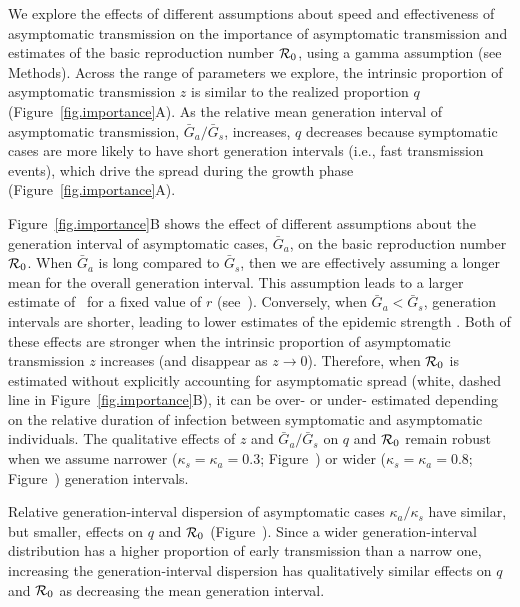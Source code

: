 We explore the effects of different assumptions about speed and effectiveness of asymptomatic transmission on the importance of asymptomatic transmission and estimates of the basic reproduction number ${\cal{R}}_0$, using a gamma assumption (see Methods).
Across the range of parameters we explore, the intrinsic proportion of asymptomatic transmission $z$ is similar to the realized proportion $q$ (Figure~\ref{fig.importance}A).
As the relative mean generation interval of asymptomatic transmission, $\bar G_a/\bar G_s$, increases, $q$ decreases because symptomatic cases are more likely to have short generation intervals (i.e., fast transmission events), which drive the spread during the growth phase (Figure~\ref{fig.importance}A).
\DIFaddbegin {}\DIFaddend 

Figure~\ref{fig.importance}B shows the effect of different assumptions about the generation interval of asymptomatic cases, $\bar G_a$, on the basic reproduction number ${\cal{R}}_0$.
When $\bar G_a$ is long compared to $\bar G_s$, then we are effectively assuming a longer mean for the overall generation interval. 
This assumption leads to a larger estimate of \Ro\ for a fixed value of $r$ (see~\citep{park_2019practical}).
Conversely, when $\bar G_a < \bar G_s$, generation intervals are shorter, leading to lower estimates of the epidemic strength \Ro. Both of these effects are stronger when the intrinsic proportion of asymptomatic transmission $z$ increases (and disappear as $z\to0$).
Therefore, when ${\cal{R}}_0$ is estimated without explicitly accounting for asymptomatic spread (white, dashed line in Figure~\ref{fig.importance}B), it can be over- or under- estimated depending on the relative duration of infection between symptomatic and asymptomatic individuals.
The qualitative effects of $z$ and $\bar G_a/\bar G_s$ on $q$ and ${\cal{R}}_0$ remain robust when we assume narrower ($\kappa_s = \kappa_a = 0.3$; Figure~\DIFdelbegin {}\DIFdelend \DIFaddbegin {}\DIFaddend ) or wider ($\kappa_s = \kappa_a = 0.8$; Figure~\DIFdelbegin {}\DIFdelend \DIFaddbegin {}\DIFaddend ) generation intervals.

Relative generation-interval dispersion of asymptomatic cases $\kappa_a/\kappa_s$ have similar, but smaller, effects on $q$ and ${\cal{R}}_0$ (Figure~\DIFdelbegin {}\DIFdelend \DIFaddbegin {}\DIFaddend ).
Since a wider generation-interval distribution has a higher proportion of early transmission than a narrow one, increasing the generation-interval dispersion has qualitatively similar effects on $q$ and ${\cal{R}}_0$ as decreasing the mean generation interval.

